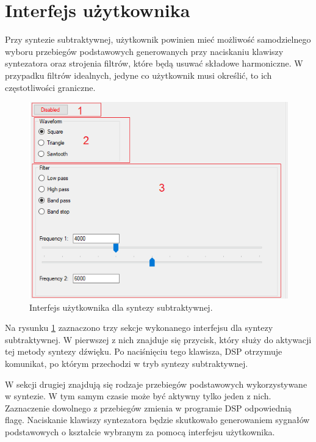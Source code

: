 \section{Interfejs użytkownika}
Przy syntezie subtraktywnej, użytkownik powinien mieć możliwość samodzielnego wyboru przebiegów podstawowych generowanych przy naciskaniu klawiszy syntezatora oraz strojenia filtrów, które będą usuwać składowe harmoniczne. W przypadku filtrów idealnych, jedyne co użytkownik musi określić, to ich częstotliwości graniczne.
\begin{figure}[H]
	\centering
	\includegraphics[width=12cm]{grafiki/sub_interface}
	\captionsetup{justification=centering}
	\caption{Interfejs użytkownika dla syntezy subtraktywnej.}
	\label{rys:sub_interface}
\end{figure}
Na rysunku \ref{rys:sub_interface} zaznaczono trzy sekcje wykonanego interfejsu dla syntezy subtraktywnej. W pierwszej z nich znajduje się przycisk, który służy do aktywacji tej metody syntezy dźwięku. Po naciśnięciu tego klawisza, DSP otrzymuje komunikat, po którym przechodzi w tryb syntezy subtraktywnej.

W sekcji drugiej znajdują się rodzaje przebiegów podstawowych wykorzystywane w syntezie. W tym samym czasie może być aktywny tylko jeden z nich. Zaznaczenie dowolnego z przebiegów zmienia w programie DSP odpowiednią flagę. Naciskanie klawiszy syntezatora będzie skutkowało generowaniem sygnałów podstawowych o kształcie wybranym za pomocą interfejsu użytkownika.

